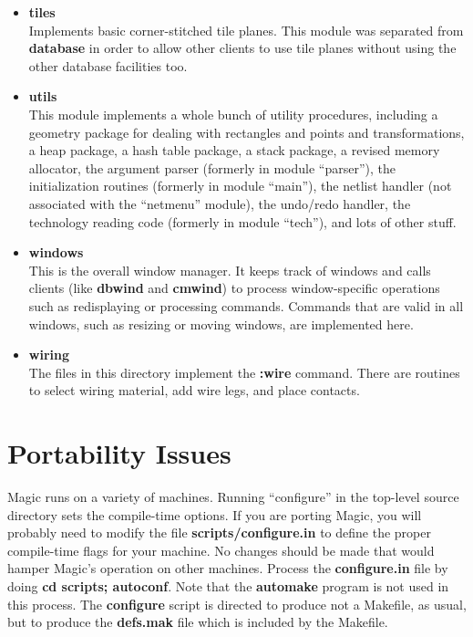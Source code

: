 \documentclass[letterpaper,twoside,12pt]{article}
\begin{document}
\begin{itemize}
\item {\bfseries tiles}  \\
Implements basic corner-stitched tile planes.  This module was
separated from {\bfseries database} in order to allow other clients
to use tile planes without using the other database facilities
too.

\item {\bfseries utils}  \\
This module implements a whole bunch of utility procedures,
including a geometry package for dealing with rectangles and
points and transformations, a heap package, a hash table package,
a stack package, a revised memory allocator, the argument parser
(formerly in module ``parser''), the initialization routines
(formerly in module ``main''), the netlist handler (not associated
with the ``netmenu'' module), the undo/redo handler, the technology
reading code (formerly in module ``tech''), and lots of other stuff.

\item {\bfseries windows}  \\
This is the overall window manager.  It keeps track of windows
and calls clients (like {\bfseries dbwind} and {\bfseries cmwind}) to process
window-specific operations such as redisplaying or processing
commands.  Commands that are valid in all windows, such as
resizing or moving windows, are implemented here.

\item {\bfseries wiring}  \\
The files in this directory implement the {\bfseries :wire} command.
There are routines to select wiring material, add wire legs,
and place contacts.
\end{itemize}

\section{Portability Issues} \label{porting}

Magic runs on a variety of machines.  Running ``configure'' in the top-level
source directory sets the compile-time options.  
If you are porting Magic, you will probably need to modify the file
{\bfseries scripts/configure.in} to define the proper compile-time flags
for your machine.  No changes should be made that would hamper Magic's
operation on other machines.  Process the {\bfseries configure.in} file
by doing {\bfseries cd scripts; autoconf}.  Note that the {\bfseries
automake} program is not used in this process.  The {\bfseries configure}
script is directed to produce not a Makefile, as usual, but to produce
the {\bfseries defs.mak} file which is included by the Makefile.
\end{document}
